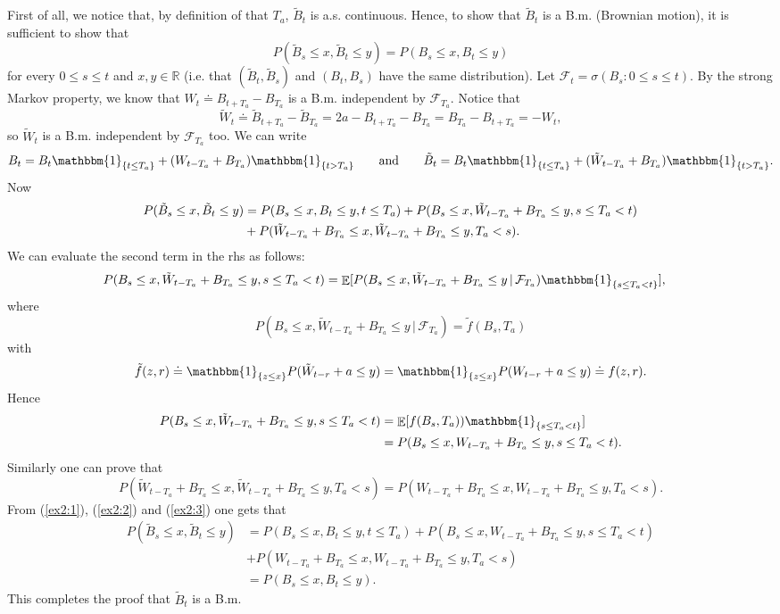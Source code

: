\documentclass[a4paper,11pt]{article}
\theoremstyle{definition}
\theoremstyle{plain}
\theoremstyle{remark}
\DeclarePairedDelimiter{\parq}{[}{]}
\DeclarePairedDelimiter{\bra}{\lbrace}{\rbrace}
\DeclareMathOperator*{\expval}{\mathbb{E}}
\begin{document}
First of all, we notice that, by definition of that $T_a$, $\tilde{B}_t$ is a.s. continuous. Hence, to show that $\tilde{B}_t$ is a B.m. (Brownian motion), it is sufficient to show that
$$
P(\tilde{B}_s \leq x, \tilde{B}_t \leq y) = P(B_s \leq x, B_t \leq y)
$$
for every $0\leq s\leq t$ and $x,y\in\mathbb{R}$ (i.e. that $(\tilde{B}_t,\tilde{B}_s)$ and $(B_t,B_s)$ have the same distribution). Let $\mathcal{F}_t= \sigma(B_s: 0\leq s \leq t)$. By the strong Markov property, we know that $W_t \doteq B_{t+T_a} - B_{T_a}$ is a B.m. independent by $\mathcal{F}_{T_a}$. Notice that 
$$
\tilde{W}_t \doteq \tilde{B}_{t+T_a} - \tilde{B}_{T_a} = 2a - B_{t+T_a} - B_{T_a} = B_{T_a} - B_{t+T_a} = -W_t,
$$
so $\tilde{W}_t$ is a B.m. independent by $\mathcal{F}_{T_a}$ too. We can write
\begin{align*}
B_t = B_t\mathbbm{1}_{\bra{t\leq T_a}} + (W_{t-T_a} + B_{T_a})\mathbbm{1}_{\bra{t> T_a}} \qquad \text{and} \qquad \tilde{B}_t = B_t\mathbbm{1}_{\bra{t\leq T_a}} + (\tilde{W}_{t-T_a} + B_{T_a})\mathbbm{1}_{\bra{t> T_a}}.
\end{align*}
Now 
\begin{align}
P(\tilde{B}_s \leq x, \tilde{B}_t \leq y) & = P(B_s \leq x, B_t \leq y, t\leq T_a) + P(B_s \leq x, \tilde{W}_{t-T_a} + B_{T_a} \leq y, s\leq T_a<t) \notag \\ & + P(\tilde{W}_{t-T_a} + B_{T_a} \leq x, \tilde{W}_{t-T_a} + B_{T_a} \leq y, T_a<s). \label{ex2:1}
\end{align}
We can evaluate the second term in the rhs as follows:
\begin{align*}
P(B_s \leq x, \tilde{W}_{t-T_a} + B_{T_a} \leq y, s\leq T_a<t) & = \expval\parq{P(B_s \leq x, \tilde{W}_{t-T_a} + B_{T_a} \leq y\,|\,\mathcal{F}_{T_a})\mathbbm{1}_{\bra{s\leq T_a<t}}}, 
\end{align*}
where
$$
P(B_s \leq x, \tilde{W}_{t-T_a} + B_{T_a} \leq y\,|\,\mathcal{F}_{T_a}) = \tilde{f}(B_s,T_a)
$$
with
$$
\tilde{f}(z,r) \doteq \mathbbm{1}_{\bra{z \leq x}} P(\tilde{W}_{t-r} + a \leq y) = \mathbbm{1}_{\bra{z \leq x}} P(W_{t-r} + a \leq y) \doteq f(z,r).
$$
Hence
\begin{align}
P(B_s \leq x, \tilde{W}_{t-T_a} + B_{T_a} \leq y, s\leq T_a<t) & = \expval\parq{f(B_s,T_a))\mathbbm{1}_{\bra{s\leq T_a<t}}} \notag \\ & = P(B_s \leq x, W_{t-T_a} + B_{T_a} \leq y, s\leq T_a<t).\label{ex2:2} 
\end{align}
Similarly one can prove that
\begin{equation}
P(\tilde{W}_{t-T_a} + B_{T_a} \leq x, \tilde{W}_{t-T_a} + B_{T_a} \leq y, T_a<s) = P(W_{t-T_a} + B_{T_a} \leq x, W_{t-T_a} + B_{T_a} \leq y, T_a<s) \label{ex2:3}.
\end{equation}
From (\ref{ex2:1}), (\ref{ex2:2}) and (\ref{ex2:3}) one gets that
\begin{align*}
P(\tilde{B}_s \leq x, \tilde{B}_t \leq y) & = P(B_s \leq x, B_t \leq y, t\leq T_a) + P(B_s \leq x, W_{t-T_a} + B_{T_a} \leq y, s\leq T_a<t) \\ & + P(W_{t-T_a} + B_{T_a} \leq x, W_{t-T_a} + B_{T_a} \leq y, T_a<s) \\ &  = P(B_s \leq x, B_t \leq y).
\end{align*}
This completes the proof that $\tilde{B}_t$ is a B.m.
\end{document}
